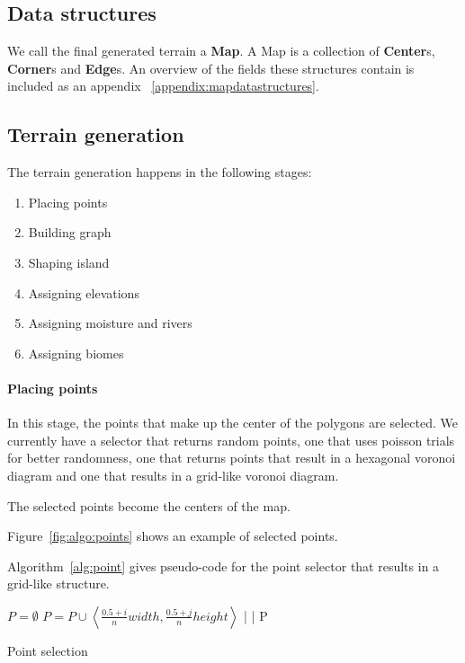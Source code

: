 
\subsection{Data structures}

We call the final generated terrain a \textbf{Map}.
A Map is a collection of \textbf{Center}s, \textbf{Corner}s and \textbf{Edge}s.
An overview of the fields these structures contain is included as an appendix ~\ref{appendix:mapdatastructures}.

\subsection{Terrain generation}

The terrain generation happens in the following stages:

\begin{enumerate}
	\item Placing points
	\item Building graph
	\item Shaping island
	\item Assigning elevations
	\item Assigning moisture and rivers
	\item Assigning biomes
\end{enumerate}

\paragraph{Placing points}

In this stage, the points that make up the center of the polygons are selected.
We currently have a selector that returns random points, one that uses poisson trials for better randomness, one that returns points that result in a hexagonal voronoi diagram and one that results in a grid-like voronoi diagram.

The selected points become the centers of the map.

Figure~\ref{fig:algo:points} shows an example of selected points.

Algorithm~\ref{alg:point} gives pseudo-code for the point selector that results in a grid-like structure.

\begin{algo*}
\begin{sourcecode}
$P = \emptyset$
		$P = P \cup \left<\frac{0.5 + i}{n} width, \frac{0.5 + j}{n} height\right>$
	|
|
\return P
\qend
\end{sourcecode}
	\caption{Point selection}
	\label{alg:point}
\end{algo*}

